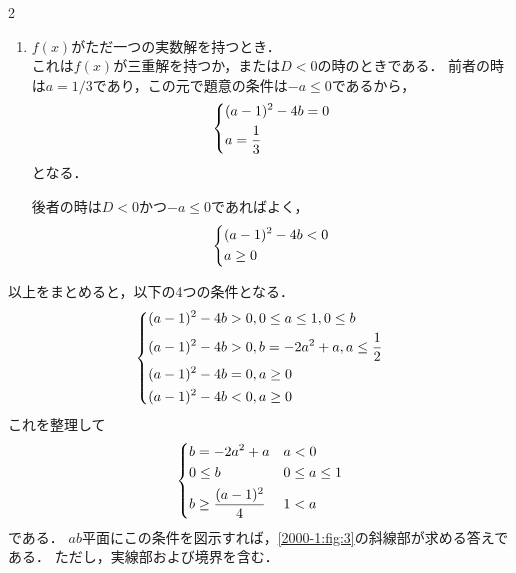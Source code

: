 \documentclass[../../main.tex]{subfiles}
\begin{document}
\begin{multicols}{2}
\begin{enumerate}
          後者の条件は，\cref{2000-1:eq:3}より
          \begin{align*}
            b & = - 2a^2+a        \\
            D & = (a-1)^2 -4b > 0
          \end{align*}
          であり，この時$g(x)$のもう一つの解は解と係数の関係から
          \begin{align*}
            x = 2a - 1
          \end{align*}
          である．題意の条件はこれが$0$以下であることで
          \begin{align*}
             & 2a-1 \le 0        \\
             & a \le \frac{1}{2}
          \end{align*}
          である．
    \item  $f(x)$がただ一つの実数解を持つとき．\\
          これは$f(x)$が三重解を持つか，または$D<0$の時のときである．
          前者の時は$a=1/3$であり，この元で題意の条件は$-a \le 0$であるから，
          \begin{align*}
            \begin{dcases}
              (a-1)^2 -4b = 0 \\
              a = \frac{1}{3}
            \end{dcases}
          \end{align*}
          となる．

          後者の時は$D<0$かつ$-a \le 0$であればよく，
          \begin{align*}
            \begin{dcases}
              (a-1)^2 -4b < 0 \\
              a \ge 0
            \end{dcases}
          \end{align*}
  \end{enumerate}

  以上をまとめると，以下の4つの条件となる．
  \begin{align*}
    \begin{dcases}
      (a-1)^2-4b > 0, 0 \le a \le 1, 0 \le b          \\
      (a-1)^2 -4b > 0, b = - 2a^2+a, a\le \frac{1}{2} \\
      (a-1)^2 -4b = 0, a \ge 0                        \\
      (a-1)^2 -4b < 0 ,      a \ge 0                  \\
    \end{dcases}
  \end{align*}
  これを整理して
  \begin{align*}
    \begin{dcases}
      b = - 2a^2+a            & a < 0         \\
      0 \le b                 & 0 \le a \le 1 \\
      b \ge \frac{(a-1)^2}{4} & 1 < a
    \end{dcases}
  \end{align*}
  である．
  $ab$平面にこの条件を図示すれば，\cref{2000-1:fig:3}の斜線部が求める答えである．
  ただし，実線部および境界を含む．


\end{multicols}
\end{document}
